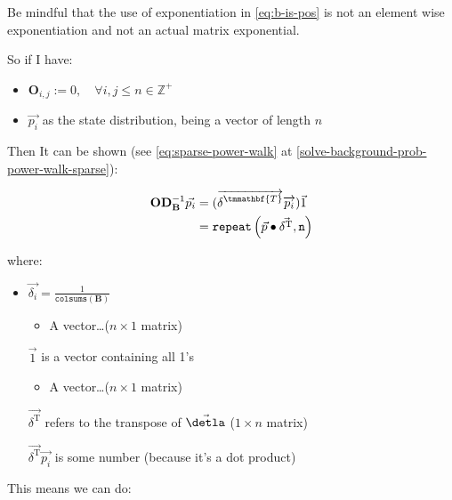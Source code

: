 \documentclass[11pt]{report}
\begin{document}
Be mindful that the use of exponentiation in \eqref{eq:b-is-pos} is not an element wise
exponentiation and not an actual matrix exponential.

So if I have:

\begin{itemize}
\item \(\mathbf{O}_{i, j} := 0, \quad \forall i,j\leq n \in \mathbb{Z}^+\)

\item \(\vec{p_i}\) as the state distribution, being a vector of length \(n\)
\end{itemize}

Then It can be shown (see \eqref{eq:sparse-power-walk} at \ref{solve-background-prob-power-walk-sparse}):

\begin{align}
    \mathbf{O} \mathbf{D}_{\mathbf{B}}^{-1} \vec{p_i} &= (\overrightarrow{\delta^{{\footnotesize \tmmathbf{T}}}}
     \overrightarrow{p_i})  \vec{1}\\
& = \mathtt{repeat} \left(\vec{p} \bullet \vec{\delta^{\tiny \mathrm{T}}} \mathtt{, n} \right) \\
\end{align}



where:

\begin{itemize}
\item \(\vec{\delta_i} = \frac{1}{\mathtt{colsums} \left( \mathbf{B} \right)}\)
\begin{itemize}
\item A vector\ldots{}(\(n\times 1\) matrix)
\end{itemize}
\item[{\(\vec{1}\) }] is a vector containing all 1's
\begin{itemize}
\item A vector\ldots{}(\(n\times 1\) matrix)
\end{itemize}
\item[{\(\vec{\delta^{\mathrm{T}}}\)}] refers to the transpose of \(\vec{\detla}\) (\(1\times n\) matrix)
\item[{\(\vec{\delta^{\mathrm{T}}} \vec{p_{i}}\)}] is some number (because it's a dot product)
\end{itemize}

This means we can do:
\end{document}

